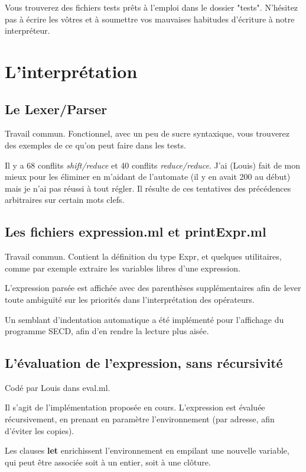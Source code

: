\documentclass[a4paper,10pt]{report}
\begin{document}
Vous trouverez des fichiers tests prêts à l'emploi dans le dossier "tests". N'hésitez pas à écrire les vôtres et à soumettre vos mauvaises habitudes d'écriture à notre interpréteur.   

\chapter*{L'interprétation}

\section{Le Lexer/Parser}
Travail commun. Fonctionnel, avec un peu de sucre syntaxique, vous trouverez des exemples de ce qu'on peut faire dans les tests.

Il y a 68 conflits \textit{shift/reduce} et 40 conflits \textit{reduce/reduce}. J'ai (Louis) fait de mon mieux pour les éliminer en m'aidant de l'automate (il y en avait 200 au début) mais je n'ai pas réussi à tout régler. Il résulte de ces tentatives des précédences arbitraires sur certain mots clefs.  

\section{Les fichiers expression.ml et printExpr.ml}
Travail commun. Contient la définition du type Expr, et quelques utilitaires, comme par exemple extraire les variables libres d'une expression.  
  
L'expression parsée est affichée avec des parenthèses supplémentaires afin de lever toute ambiguïté sur les priorités dans l'interprétation des opérateurs.  
  
Un semblant d'indentation automatique a été implémenté pour l'affichage du programme SECD, afin d'en rendre la lecture plus aisée.  
   
\section{L'évaluation de l'expression, sans récursivité}  
Codé par Louis dans eval.ml.  

Il s'agit de l'implémentation proposée en cours. L'expression est évaluée récursivement, en prenant en paramètre l'environnement (par adresse, afin d'éviter les copies).  
  
Les clauses \textbf{let} enrichissent l'environnement en empilant une nouvelle variable, qui peut être associée soit à un entier, soit à une clôture.  
  
\end{document}
